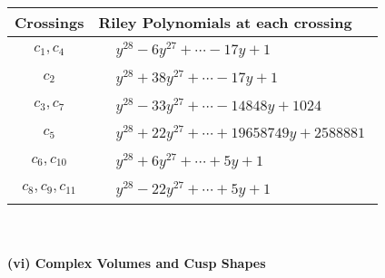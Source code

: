 \documentclass[1p]{elsarticle_modified}
\theoremstyle{definition}
\begin{document}
\begin{tabular}{m{50pt}|m{274pt}}
Crossings & \hspace{64pt}Riley Polynomials at each crossing \\
\hline $$\begin{aligned}c_{1},c_{4}\end{aligned}$$&$\begin{aligned}
&y^{28}-6 y^{27}+\cdots-17 y+1
\end{aligned}$\\
\hline $$\begin{aligned}c_{2}\end{aligned}$$&$\begin{aligned}
&y^{28}+38 y^{27}+\cdots-17 y+1
\end{aligned}$\\
\hline $$\begin{aligned}c_{3},c_{7}\end{aligned}$$&$\begin{aligned}
&y^{28}-33 y^{27}+\cdots-14848 y+1024
\end{aligned}$\\
\hline $$\begin{aligned}c_{5}\end{aligned}$$&$\begin{aligned}
&y^{28}+22 y^{27}+\cdots+19658749 y+2588881
\end{aligned}$\\
\hline $$\begin{aligned}c_{6},c_{10}\end{aligned}$$&$\begin{aligned}
&y^{28}+6 y^{27}+\cdots+5 y+1
\end{aligned}$\\
\hline $$\begin{aligned}c_{8},c_{9},c_{11}\end{aligned}$$&$\begin{aligned}
&y^{28}-22 y^{27}+\cdots+5 y+1
\end{aligned}$\\
\hline
\end{tabular}\\~\\
\newpage\flushleft \textbf{(vi) Complex Volumes and Cusp Shapes}
\end{document}
